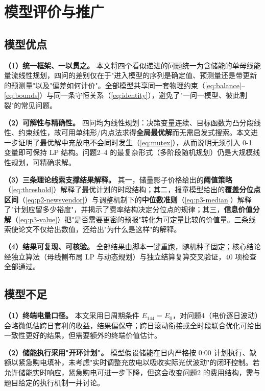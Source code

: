 \section{模型评价与推广}

\subsection{模型优点}

\textbf{（1）统一框架、一以贯之。} 本文将四个看似递进的问题统一为含储能的单母线能量流线性规划，四问的差别仅在于"进入模型的序列是确定值、预测量还是带更新的预测量"以及"偏差如何计价"。全部模型共享同一套物理约束（\cref{eq:balance}--\cref{eq:bounds}）与同一条守恒关系（\cref{eq:identity}），避免了"一问一模型、彼此割裂"的常见问题。

\textbf{（2）可解性与精确性。} 四问均为线性规划：决策变量连续、目标函数为凸分段线性、约束线性，故可用单纯形/内点法求得\textbf{全局最优解}而无需启发式搜索。本文进一步证明了最优解中充放电不会同时发生（\cref{eq:mutex}），从而说明无须引入 0-1 变量即可保持 LP 结构。问题2--4 的最复杂形式（多阶段随机规划）仍是大规模线性规划，可精确求解。

\textbf{（3）三条理论线索支撑结果解释。} 其一，储量影子价格给出的\textbf{阈值策略}（\cref{eq:threshold}）解释了最优计划的时段结构；其二，报童模型给出的\textbf{覆盖分位点区间}（\cref{eq:p2-newsvendor}）与调整机制下的\textbf{中位数准则}（\cref{eq:p3-median}）解释了"计划应留多少裕度"，并揭示了费率结构决定分位点的规律；其三，\textbf{信息价值分解}（\cref{eq:p3-value}）把"是否需要更密的预报"转化为可定量比较的价值量。三条线索使论文不仅给出数值，还给出"为什么是这样"的解释。

\textbf{（4）结果可复现、可核验。} 全部结果由脚本一键重跑，随机种子固定；核心结论经独立算法（母线侧布局 LP 与动态规划）与独立结算复算交叉验证，$40$ 项检查全部通过。

\subsection{模型不足}

\textbf{（1）终端电量口径。} 本文采用日周期条件 $E_{144}=E_0$，对问题4（电价逐日波动）会略微低估跨日套利的收益，结果偏保守；跨日滚动衔接或全时段联合优化可给出一致性更好的结果，但需要额外的终端价值估计。

\textbf{（2）储能执行采用"开环计划"。} 模型假设储能在日内严格按 0:00 计划执行、缺额以紧急购电填补，未考虑"实时调整充放电以吸收实际光伏波动"的闭环控制。若允许储能实时响应，紧急购电可进一步下降，但这会改变问题2 的费用结构，需与题目给定的执行机制一并讨论。

